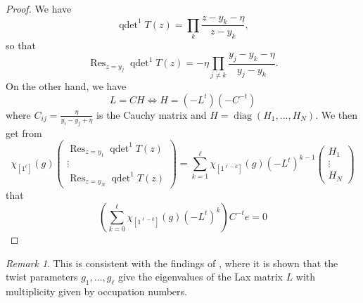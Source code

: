 \documentclass[11pt]{report}
\newtheorem{corollary}[theorem]{Corollary}
\theoremstyle{definition}
\theoremstyle{remark}
\newtheorem*{remark}{Remark}
\theoremstyle{remark}
\begin{document}
\begin{proof}
We have
\begin{equation*}
\operatorname{qdet}^1 T(z) = \prod_k \frac{z-y_k-\eta}{z-y_k},
\end{equation*}
so that
\begin{equation*}
\operatorname{Res}_{z=y_j} \operatorname{qdet}^1 T(z) = -\eta \prod_{j \neq k} \frac{y_j-y_k-\eta}{y_j-y_k}.
\end{equation*}
On the other hand, we have
\begin{equation*}
L = CH \Leftrightarrow H = (-L^t) (-C^{-t})
\end{equation*}
where $C_{ij} = \frac{\eta}{y_i-y_j+\eta}$ is the Cauchy matrix and $H = \operatorname{diag}(H_1,...,H_N)$.
We then get from
\begin{equation*}
\chi_{[1^\ell]}(g)
\begin{pmatrix}
\operatorname{Res}_{z=y_1} \operatorname{qdet}^1 T(z) \\ \vdots \\ \operatorname{Res}_{z=y_N} \operatorname{qdet}^1 T(z)
\end{pmatrix}
= \sum_{k=1}^\ell \chi_{[1^{\ell-k}]}(g) (-L^t)^{k-1}
\begin{pmatrix}
H_1 \\ \vdots \\ H_N
\end{pmatrix}
\end{equation*}
that
\begin{equation*}
\left( \sum_{k=0}^\ell \chi_{[1^{\ell-k}]}(g) (-L^t)^k \right) C^{-t} e = 0
\end{equation*}
\end{proof}

\begin{remark}
This is consistent with the findings of \cite{article:gorsky:2014}, where it is shown that the twist parameters $g_1,...,g_\ell$ give the eigenvalues of the Lax matrix $L$ with multiplicity given by occupation numbers.
\end{remark}

%
%
\end{document}
